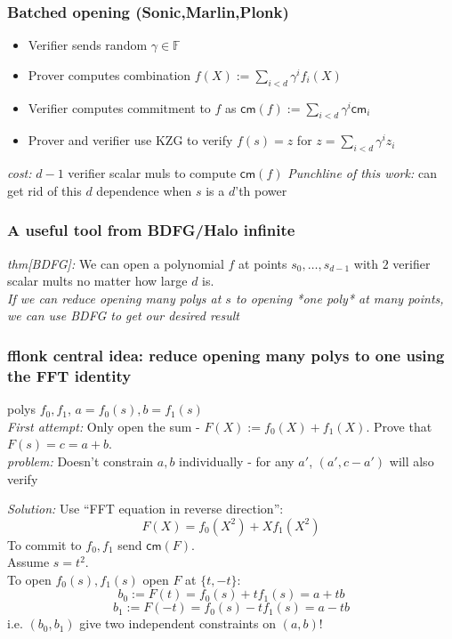 \documentclass[shadesubsections,compress,14pt,mathserif]{beamer}
\newcommand{\F}{\ensuremath{\mathbb F}}
\newcommand{\cm}{\ensuremath{\mathsf{cm}}}
\newcommand{\defeq}{\ensuremath{:=}}
\begin{document}
\begin{frame}
\frametitle{Batched opening (Sonic,Marlin,Plonk)}
\begin{itemize}
 \item Verifier sends random $\gamma\in\F$\pause
 \item Prover computes combination $f(X)\defeq \sum_{i<d} \gamma^i f_i(X)$
 \item Verifier computes commitment to $f$ as $\cm(f)\defeq \sum_{i<d} \gamma^i \cm_i$
 \item Prover and verifier use KZG to verify $f(s)=z$ for $z=\sum_{i<d} \gamma^i z_i$
\end{itemize}
\textit{cost:} $d-1$ verifier scalar muls to compute $\cm(f)$
\textit{Punchline of this work:} can get rid of this $d$ dependence when $s$ is a $d$'th power
\end{frame}
\begin{frame}
\frametitle{A useful tool from BDFG/Halo infinite}
\textit{thm{\small [BDFG]}:} We can open a polynomial $f$ at points $s_0,\ldots,s_{d-1}$ with $2$ verifier scalar mults no matter how large $d$ is.\\ \pause
 \vspace{0.4in}
 \textit{If we can reduce opening many polys at $s$ to opening *one poly* at many points, we can use BDFG to get our desired result}
\end{frame}
\begin{frame}
\frametitle{fflonk central idea: reduce opening many polys to one using the FFT identity}
polys $f_0,f_1$, $a=f_0(s),b=f_1(s)$\\ \pause
 \vspace{0.2in}
\textit{First attempt:}
Only open the sum -
$F(X)\defeq f_0(X)+f_1(X)$.
Prove that $F(s)=c=a+b$.\\ \pause
\textit{problem:} Doesn't constrain $a,b$ individually - for any $a'$, $(a',c-a')$ will also verify \\ \pause
 \vspace{0.2in}

\end{frame}
\begin{frame}
\textit{Solution:} Use ``FFT equation in reverse direction'':
 \[F(X)=f_0(X^2)+X f_1(X^2)\]
To commit to $f_0,f_1$ send $\cm(F)$.\\ \pause 
 \vspace{0.2in}
Assume $s=t^2$.\\
To open $f_0(s),f_1(s)$ open $F$ at $\{t,-t\}$:\\ \pause
\[b_0\defeq F(t) = f_0(s)+t f_1(s)=a+tb\]
\[b_1\defeq F(-t) = f_0(s)-t f_1(s)=a-tb\]
i.e. $(b_0,b_1)$ give two independent constraints on $(a,b)$!
\end{frame}
\end{document}
